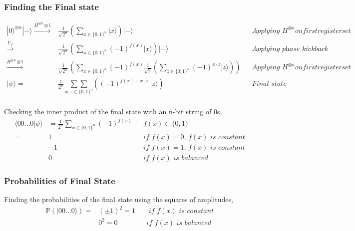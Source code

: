 \documentclass{article}
\begin{document}
    \subsubsection{Finding the Final state}
    \begin{align*}
        |0\rangle^{\otimes n}|-\rangle \xrightarrow{H^{\otimes n} \otimes \mathbb{I}} & \frac{1}{\sqrt{2^n}} \left( \sum_{x \in \{0,1\}^n} |x\rangle \right) |-\rangle && \textit{Applying $H^{\otimes n} on first register set$} \\
        \xrightarrow{U_f} & \frac{1}{\sqrt{2^n}} \left( \sum_{x \in \{0,1\}^n} (-1)^{f(x)}|x\rangle \right) |-\rangle && \textit{Applying phase kickback}\\
        \xrightarrow{H^{\otimes n} \otimes \mathbb{I}} & \frac{1}{\sqrt{2^n}} \left( \sum_{x \in \{0,1\}^n} (-1)^{f(x)} \frac{1}{\sqrt{2}} \left( \sum_{z \in \{0,1\}^n} (-1)^{x\cdot z} |z\rangle \right) \right) && \textit{Applying $H^{\otimes n} on first register set$} \\
        |\psi \rangle=& \frac{1}{2^n} \ \underset{x,z \in \{0, 1\}^n}{\sum \sum }\left( (-1)^{f(x) + x \cdot z} \ |z\rangle \right) && \textit{Final state}\\
    \end{align*}

    Checking the inner product of the final state with an n-bit string of $0$s,
    \begin{align*}
        \langle 00 \hdots 0 | \psi \rangle &= \frac{1}{2^n} \sum_{x \in \{0, 1\}^n} (-1)^{f(x)} && f(x) \in \{0, 1\} \\
        =& 1 && \textit{if $f(x)=0$, $f(x)$ is constant} \\
        & -1 && \textit{if $f(x)=1$, $f(x)$ is constant} \\
        & 0 && \textit{if $f(x)$ is balanced}
    \end{align*}

    \subsubsection{Probabilities of Final State}
    Finding the probabilities of the final state using the squares of amplitudes,
    \begin{align*}
    \mathds{P}(|00\hdots 0\rangle) = &(\pm 1)^2 = 1 && \textit{ if $f(x)$ is constant} \\
    & 0^2 = 0 && \textit{if $f(x)$ is balanced}
    \end{align*}
\end{document}
